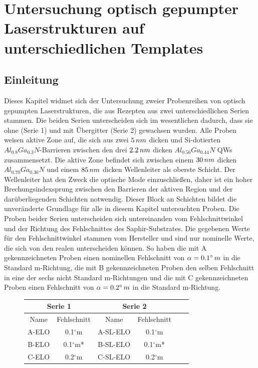 
\thispagestyle{fancy}
\justifying
\chapter{Untersuchung optisch gepumpter Laserstrukturen auf unterschiedlichen Templates}
\label{chap:offcut}

\section{Einleitung}
Dieses Kapitel widmet sich der Untersuchung zweier Probenreihen von optisch gepumpten Laserstrukturen, die aus Rezepten aus zwei unterschiedlichen Serien stammen. Die beiden Serien unterscheiden sich im wesentlichen dadurch, dass sie ohne (Serie 1) und mit Übergitter (Serie 2) gewachsen wurden. Alle Proben weisen aktive Zone auf, die sich aus zwei $5 \thinspace nm$ dicken und Si-dotierten $ Al_{0.8}Ga_{0.3}N$-Barrieren zwischen den drei $2.2 \thinspace nm$ dicken $ Al_{0.56}Ga_{0.44}N$ QWs zusammensetzt. Die aktive Zone befindet sich zwischen einem $30 \thinspace nm$ dicken $ Al_{0.70}Ga_{0.30}N$ und einem $85 \thinspace nm$ dicken Wellenleiter als oberste Schicht. Der Wellenleiter hat den Zweck die optische Mode einzuschließen, daher ist ein hoher Brechungsindexsprung zwischen den Barrieren der aktiven Region und der darüberliegenden Schichten notwendig.
\newline
Dieser Block an Schichten bildet die unveränderte Grundlage für alle in diesem Kapitel untersuchten Proben.
\newline
Die Proben beider Serien unterscheiden sich untereinanden vom Fehlschnittwinkel und der Richtung des Fehlschnittes des Saphir-Substrates. Die gegebenen Werte für den Fehlschnittwinkel stammen vom Hersteller und sind nur nominelle Werte, die sich von den realen unterscheiden können. So haben die mit A gekennzeichneten Proben einen nominellen Fehlschnitt von $\alpha = 0.1^\circ \thinspace m$ in die Standard m-Richtung, die mit B gekennzeichneten Proben den selben Fehlschnitt in eine der sechs nicht Standard m-Richtungen und die mit C gekennzeichneten Proben einen Fehlschnitt von $\alpha = 0.2^\circ \thinspace m$ in die Standard m-Richtung. 
\begin{figure}[H]
\centering
\begin{tabular}{ |c|c|c|c|c|c|   }
\hline
\multicolumn{2}{|c|}{Serie 1} & \multicolumn{2}{c|}{Serie 2}  \\
\hline
Name & Fehlschnitt &  Name & Fehlschnitt  \\
\hline
A-ELO & 0.1$^\circ$m  & A-SL-ELO & 0.1$^\circ$m \\
B-ELO & 0.1$^\circ$m* & B-SL-ELO & 0.1$^\circ$m* \\
C-ELO & 0.2$^\circ$m  & C-SL-ELO & 0.2$^\circ$m \\
\hline
\end{tabular}
\end{figure}
